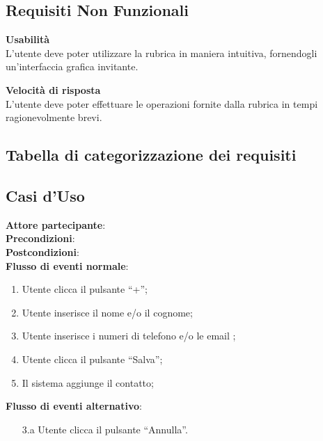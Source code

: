 \subsection{Requisiti Non Funzionali}
\newcommand{\FCitem}{\addtocounter{FCcounter}{1}FC-\theFCcounter}
\begin{tcolorbox}[colback=white,colframe=black!80!white,title=\textbf{Vincoli FC}]
	\begin{itemize}[itemsep=2pt, topsep=0pt, label=\textbf{\FCitem}]
		\item \textbf{Usabilità}
		\\L’utente deve poter utilizzare la rubrica in maniera intuitiva,
		fornendogli un’interfaccia grafica invitante.
		
		\item \textbf{Velocità di risposta}
		\\L’utente deve poter effettuare le operazioni fornite dalla rubrica in tempi ragionevolmente brevi.		
	\end{itemize}
\end{tcolorbox}

\subsection{Tabella di categorizzazione dei requisiti}

\newpage
\subsection{Casi d'Uso}
\begin{tcolorbox}[colback=white,colframe=black!80!white,title=\textbf{C0 - Aggiungere contatto}]
\textbf{Attore partecipante}:
\\\textbf{Precondizioni}: 
\\\textbf{Postcondizioni}:
\\\textbf{Flusso di eventi normale}:
\begin{enumerate}[noitemsep, topsep=0pt]
	\item Utente clicca il pulsante “+”;
	\item Utente inserisce il nome e/o il cognome;
	\item Utente inserisce i numeri di telefono e/o le email ;
	\item Utente clicca il pulsante “Salva”;
	\item Il sistema aggiunge il contatto;
\end{enumerate}
\textbf{Flusso di eventi alternativo}:
\begin{itemize}[noitemsep, topsep=0pt]
	\item[3.a] Utente clicca il pulsante “Annulla”.
\end{itemize}
\end{tcolorbox}


